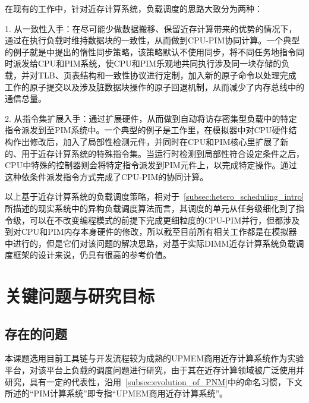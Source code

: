     在现有的工作中，针对近存计算系统，负载调度的思路大致分为两种：
    
    1. 从一致性入手：在尽可能少做数据搬移、保留近存计算带来的优势的情况下，通过在执行负载时维持数据块的一致性，从而做到CPU-PIM协同计算。一个典型的例子就是\citep{boroumand_lazypim_2017}中提出的惰性同步策略，该策略默认不使用同步，将不同任务地指令同时派发给CPU和PIM系统，使CPU和PIM乐观地共同执行涉及同一块存储的负载，并对TLB、页表结构和一致性协议进行定制，加入新的原子命令以处理完成工作的原子提交以及涉及脏数据块操作的原子回退机制，从而减少了内存总线中的通信总量。
    
    2. 从指令集扩展入手：通过扩展硬件，从而做到自动将访存密集型负载中的特定指令派发到至PIM系统中。一个典型的例子是工作\citep{ahn_pim-enabled_2015}里，在模拟器中对CPU硬件结构作出修改后，加入了局部性检测元件，并同时在CPU和PIM核心里扩展了新的、用于近存计算系统的特殊指令集。当运行时检测到局部性符合设定条件之后，CPU中特殊的控制器则会将特定指令派发到PIM元件上，以完成特定操作。通过这种依条件派发指令方式完成了CPU-PIM的协同计算。
    
    以上基于近存计算系统的负载调度策略，相对于~\ref{subsec:hetero_scheduling_intro}所描述的现实系统中的异构负载调度算法而言，其调度的单元从任务级细化到了指令级，可以在不改变编程模式的前提下完成更细粒度的CPU-PIM并行，但都涉及到对CPU和PIM内存本身硬件的修改，所以截至目前所有相关工作都是在模拟器中进行的，但是它们对该问题的解决思路，对基于实际DIMM近存计算系统负载调度框架的设计来说，仍具有很高的参考价值。

\section{关键问题与研究目标}\label{sec:problems_and_goals}
    \subsection{存在的问题}\label{subsec:existed_problems}
    本课题选用目前工具链与开发流程较为成熟的UPMEM商用近存计算系统作为实验平台，对该平台上负载的调度问题进行研究，由于其在近存计算领域被广泛使用并研究，具有一定的代表性，沿用~\ref{subsec:evolution_of_PNM}中的命名习惯，下文所述的“PIM计算系统”即专指“UPMEM商用近存计算系统”。
    
